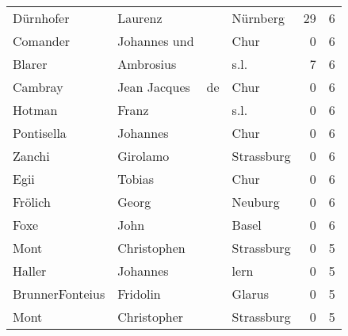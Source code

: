 \begin{center}
\begin{tiny}
\begin{longtabu}{llllrr}
                Dürnhofer &                            Laurenz &             &                                    Nürnberg &         29 &         6 \\
                 Comander &                       Johannes und &             &                                        Chur &          0 &         6 \\
                   Blarer &                          Ambrosius &             &                                        s.l. &          7 &         6 \\
                  Cambray &                       Jean Jacques &          de &                                        Chur &          0 &         6 \\
                   Hotman &                              Franz &             &                                        s.l. &          0 &         6 \\
               Pontisella &                           Johannes &             &                                        Chur &          0 &         6 \\
                   Zanchi &                           Girolamo &             &                                  Strassburg &          0 &         6 \\
                     Egii &                             Tobias &             &                                        Chur &          0 &         6 \\
                  Frölich &                              Georg &             &                                     Neuburg &          0 &         6 \\
                     Foxe &                               John &             &                                       Basel &          0 &         6 \\
                     Mont &                        Christophen &             &                                  Strassburg &          0 &         5 \\
                   Haller &                           Johannes &             &                                        lern &          0 &         5 \\
          BrunnerFonteius &                           Fridolin &             &                                      Glarus &          0 &         5 \\
                     Mont &                        Christopher &             &                                  Strassburg &          0 &         5 \\

\end{longtabu}
\end{tiny}
\end{center}
